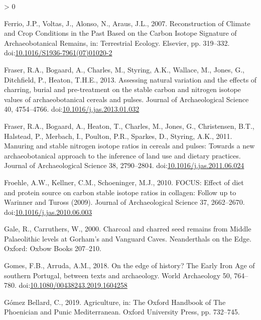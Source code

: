 \documentclass[5p]{elsarticle} %
\newlength{\cslhangindent}
\newenvironment{CSLReferences}[2] %
 {%
  \setlength{\parindent}{0pt}
  \ifodd #1 \everypar{\setlength{\hangindent}{\cslhangindent}}\ignorespaces\fi
  \ifnum #2 > 0
  \setlength{\parskip}{#2\baselineskip}
  \fi
 }%
 {}
\begin{document}
\begin{CSLReferences}{1}{0}
\leavevmode\hypertarget{ref-ferrio_etal07}{}%
Ferrio, J.P., Voltas, J., Alonso, N., Araus, J.L., 2007. Reconstruction of {Climate} and {Crop Conditions} in the {Past Based} on the {Carbon Isotope Signature} of {Archaeobotanical Remains}, in: Terrestrial {Ecology}. {Elsevier}, pp. 319--332. doi:\href{https://doi.org/10.1016/S1936-7961(07)01020-2}{10.1016/S1936-7961(07)01020-2}

\leavevmode\hypertarget{ref-fraser_etal13a}{}%
Fraser, R.A., Bogaard, A., Charles, M., Styring, A.K., Wallace, M., Jones, G., Ditchfield, P., Heaton, T.H.E., 2013. Assessing natural variation and the effects of charring, burial and pre-treatment on the stable carbon and nitrogen isotope values of archaeobotanical cereals and pulses. Journal of Archaeological Science 40, 4754--4766. doi:\href{https://doi.org/10.1016/j.jas.2013.01.032}{10.1016/j.jas.2013.01.032}

\leavevmode\hypertarget{ref-fraser_etal11}{}%
Fraser, R.A., Bogaard, A., Heaton, T., Charles, M., Jones, G., Christensen, B.T., Halstead, P., Merbach, I., Poulton, P.R., Sparkes, D., Styring, A.K., 2011. Manuring and stable nitrogen isotope ratios in cereals and pulses: Towards a new archaeobotanical approach to the inference of land use and dietary practices. Journal of Archaeological Science 38, 2790--2804. doi:\href{https://doi.org/10.1016/j.jas.2011.06.024}{10.1016/j.jas.2011.06.024}

\leavevmode\hypertarget{ref-froehle_etal10}{}%
Froehle, A.W., Kellner, C.M., Schoeninger, M.J., 2010. {FOCUS}: Effect of diet and protein source on carbon stable isotope ratios in collagen: Follow up to {Warinner} and {Tuross} (2009). Journal of Archaeological Science 37, 2662--2670. doi:\href{https://doi.org/10.1016/j.jas.2010.06.003}{10.1016/j.jas.2010.06.003}

\leavevmode\hypertarget{ref-gale_carruthers00}{}%
Gale, R., Carruthers, W., 2000. Charcoal and charred seed remains from {Middle Palaeolithic} levels at {Gorham}'s and {Vanguard Caves}. Neanderthals on the Edge. Oxford: Oxbow Books 207--210.

\leavevmode\hypertarget{ref-gomes_arruda18}{}%
Gomes, F.B., Arruda, A.M., 2018. On the edge of history? {The Early Iron Age} of southern {Portugal}, between texts and archaeology. World Archaeology 50, 764--780. doi:\href{https://doi.org/10.1080/00438243.2019.1604258}{10.1080/00438243.2019.1604258}

\leavevmode\hypertarget{ref-gomezbellard19}{}%
Gómez Bellard, C., 2019. Agriculture, in: The {Oxford Handbook} of {The Phoenician} and {Punic Mediterranean}. {Oxford University Press}, pp. 732--745.


\end{CSLReferences}
\end{document}
